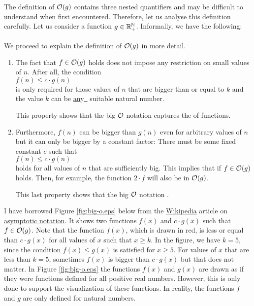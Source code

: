 The definition of $\mathcal{O}(g)$ contains three nested quantifiers and may be difficult to understand
when first encountered.  Therefore, let us analyse this definition carefully.  Let us consider a
function $g \in {\mathbb R}_+^{\mathbb N}$.  Informally, we have the following:
\\[0.2cm]
\hspace*{1.3cm}
\colorbox{red}{}
\\[0.2cm]
We proceed to explain the definition of $\mathcal{O}(g)$ in more detail.
\begin{enumerate}
\item The fact that $f \in \mathcal{O}(g)$ holds does not impose any restriction on small values of $n$.
      After all, the condition
      \\[0.2cm]
      \hspace*{1.3cm}
      $f(n) \leq c \cdot g(n)$
      \\[0.2cm]
      is only required for those values of $n$ that are bigger than or equal to $k$ and the value
      $k$ can be \underline{an}y\hspace*{-0.1cm}\underline{\ } suitable natural number.

      This property shows that the big $\mathcal{O}$ notation captures the  of functions.
\item Furthermore, $f(n)$ can be bigger than $g(n)$ even for arbitrary values of $n$ 
      but it can only be bigger by a constant factor:  There must be some fixed constant $c$
      such that 
      \\[0.2cm]
      \hspace*{1.3cm}
      $f(n) \leq c \cdot g(n)$
      \\[0.2cm]
      holds for all values of $n$ that are sufficiently big.  This implies that if $f \in \mathcal{O}(g)$
      holds. Then, for example, the function $2 \cdot f$ will also be in $\mathcal{O}(g)$.

      This last property shows that the big $\mathcal{O}$ notation .
\end{enumerate}
I have borrowed Figure \ref{fig:big-o.eps} below from the \href{http://www.wikipedia.org}{Wikipedia} article on 
\href{http://en.wikipedia.org/wiki/Asymptotic_notation}{asymptotic notation}.  It shows two functions 
$f(x)$ and $c \cdot g(x)$ such that $f \in \mathcal{O}(g)$.  Note that the function $f(x)$, which is drawn
in red, is less or equal than $c \cdot g(x)$ for all values of $x$ such that $x \geq k$.  In the
figure, we have $k=5$, since the condition $f(x) \leq g(x)$ is satisfied for $x \geq 5$. For
values of $x$ that are less than $k = 5$, sometimes $f(x)$ is bigger than $c \cdot g(x)$ but that does
not matter.  In Figure \ref{fig:big-o.eps} the functions $f(x)$ and $g(x)$ are drawn as if they were
functions defined for all positive real numbers.  However, this is only done to support the
visualization of these functions.  In reality, the functions $f$ and $g$ are only defined for
natural numbers.


